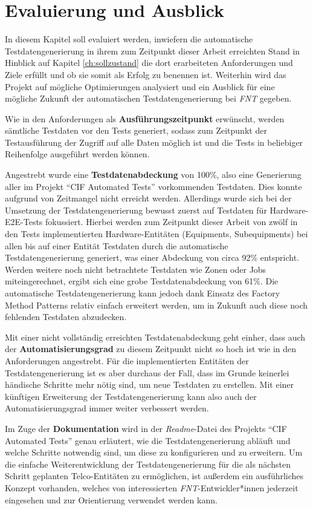 \chapter{Evaluierung und Ausblick}\label{ch:evalundausblick}
In diesem Kapitel soll evaluiert werden, inwiefern die automatische Testdatengenerierung in ihrem zum Zeitpunkt dieser Arbeit erreichten Stand in Hinblick auf Kapitel \ref{ch:sollzustand} die dort erarbeiteten Anforderungen und Ziele erfüllt und ob sie somit als Erfolg zu benennen ist. Weiterhin wird das Projekt auf mögliche Optimierungen analysiert und ein Ausblick für eine mögliche Zukunft der automatischen Testdatengenerierung bei \textit{FNT} gegeben.

Wie in den Anforderungen als \textbf{Ausführungszeitpunkt} erwünscht, werden sämtliche Testdaten vor den Tests generiert, sodass zum Zeitpunkt der Testausführung der Zugriff auf alle Daten möglich ist und die Tests in beliebiger Reihenfolge ausgeführt werden können.

Angestrebt wurde eine \textbf{Testdatenabdeckung} von 100\%, also eine Generierung aller im Projekt \enquote{\ac{CIF} Automated Tests} vorkommenden Testdaten. Dies konnte aufgrund von Zeitmangel nicht erreicht werden. Allerdings wurde sich bei der Umsetzung der Testdatengenerierung bewusst zuerst auf Testdaten für Hardware-\ac{E2E}-Tests fokussiert. Hierbei werden zum Zeitpunkt dieser Arbeit von zwölf in den Tests implementierten Hardware-Entitäten (Equipments, Subequipments) bei allen bis auf einer Entität Testdaten durch die automatische Testdatengenerierung generiert, was einer Abdeckung von circa 92\% entspricht. Werden weitere noch nicht betrachtete Testdaten wie Zonen oder Jobs miteingerechnet, ergibt sich eine grobe Testdatenabdeckung von 61\%. Die automatische Testdatengenerierung kann jedoch dank Einsatz des Factory Method Patterns relativ einfach erweitert werden, um in Zukunft auch diese noch fehlenden Testdaten abzudecken.

Mit einer nicht vollständig erreichten Testdatenabdeckung geht einher, dass auch der \textbf{Automatisierungsgrad} zu diesem Zeitpunkt nicht so hoch ist wie in den Anforderungen angestrebt. Für die implementierten Entitäten der Testdatengenerierung ist es aber durchaus der Fall, dass im Grunde keinerlei händische Schritte mehr nötig sind, um neue Testdaten zu erstellen. Mit einer künftigen Erweiterung der Testdatengenerierung kann also auch der Automatisierungsgrad immer weiter verbessert werden.

Im Zuge der \textbf{Dokumentation} wird in der \textit{Readme}-Datei des Projekts \enquote{\ac{CIF} Automated Tests} genau erläutert, wie die Testdatengenerierung abläuft und welche Schritte notwendig sind, um diese zu konfigurieren und zu erweitern. Um die einfache Weiterentwicklung der Testdatengenerierung für die als nächsten Schritt geplanten Telco-Entitäten zu ermöglichen, ist außerdem ein ausführliches Konzept vorhanden, welches von interessierten \textit{FNT}-Entwickler*innen jederzeit eingesehen und zur Orientierung verwendet werden kann.

